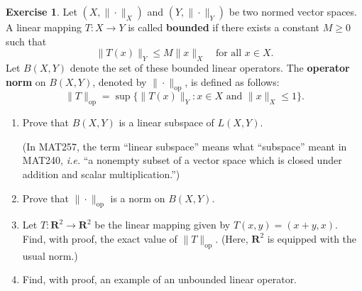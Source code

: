 \documentclass{article}
\newcommand{\R}{\mathbf{R}}
\theoremstyle{plain} %
\numberwithin{thm}{section} %
\theoremstyle{definition}
\newtheorem{exercise}[thm]{Exercise} %
\begin{document}
    \begin{exercise}
        Let $(X,\|\cdot\|_X)$ and $(Y,\|\cdot\|_Y)$ be two normed vector spaces. A linear mapping $T:X\rightarrow Y$ is called \textbf{bounded} if there exists a constant $M\geq 0$ such that
        \[ \|T(x)\|_Y \leq M \|x\|_X \quad \text{for all $x\in X$.}  \]
        Let $B(X,Y)$ denote the set of these bounded linear operators. The \textbf{operator norm} on $B(X,Y)$, denoted by $\|\cdot\|_{\mathrm{op}}$, is defined as follows:
            \[ \|T\|_{\mathrm{op}} = \sup\{ \|T(x)\|_Y : x\in X \text{ and } \|x\|_X\leq 1 \}. \]
        \begin{enumerate}[label=(\alph*)]
            \item Prove that $B(X,Y)$ is a linear subspace of $L(X,Y)$.
        
            (In MAT257, the term ``linear subspace'' means what ``subspace'' meant in MAT240, \textit{i.e.} ``a nonempty subset of a vector space which is closed under addition and scalar multiplication.'')
            
            \item Prove that $\|\cdot\|_{\mathrm{op}}$ is a norm on $B(X,Y)$.
        
            \item Let $T:\R^2\rightarrow \R^2$ be the linear mapping given by $T(x,y)=(x+y,x)$. Find, with proof, the exact value of $\|T\|_{\mathrm{op}}$. (Here, $\R^2$ is equipped with the usual norm.)
        
            \item Find, with proof, an example of an unbounded linear operator.
        \end{enumerate}
    \end{exercise}
\end{document}
